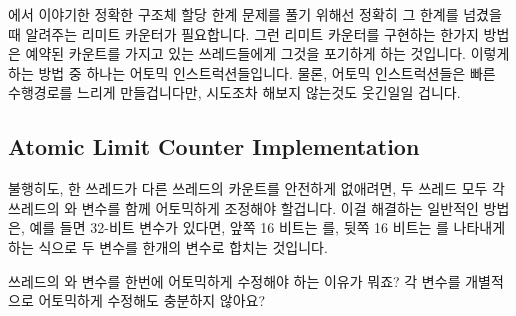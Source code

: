 {\QcountQexactcnt} 에서 이야기한 정확한 구조체 할당 한계 문제를 풀기 위해선 정확히
그 한계를 넘겼을 때 알려주는 리미트 카운터가 필요합니다.
그런 리미트 카운터를 구현하는 한가지 방법은 예약된 카운트를 가지고 있는
쓰레드들에게 그것을 포기하게 하는 것입니다.
이렇게 하는 방법 중 하나는 어토믹 인스트럭션들입니다.
물론, 어토믹 인스트럭션들은 빠른 수행경로를 느리게 만들겁니다만, 시도조차
해보지 않는것도 웃긴일일 겁니다.

\subsection{Atomic Limit Counter Implementation}
\label{sec:count:Atomic Limit Counter Implementation}

불행히도, 한 쓰레드가 다른 쓰레드의 카운트를 안전하게 없애려면, 두 쓰레드 모두
각 쓰레드의  와  변수를 함께 어토믹하게 조정해야
할겁니다.
이걸 해결하는 일반적인 방법은, 예를 들면 32-비트 변수가 있다면, 앞쪽 16 비트는
를, 뒷쪽 16 비트는  를 나타내게 하는 식으로 두
변수를 한개의 변수로 합치는 것입니다.

\QuickQuiz{}
	쓰레드의  와  변수를 한번에 어토믹하게
	수정해야 하는 이유가 뭐죠?
	각 변수를 개별적으로 어토믹하게 수정해도 충분하지 않아요?
	\iffalse

